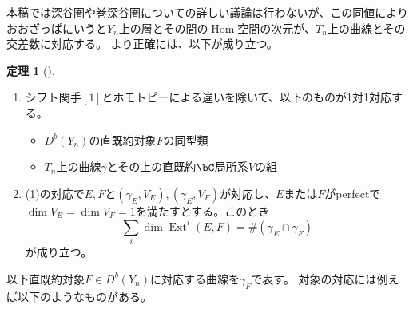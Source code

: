 \documentclass[uplatex,a4paper,dvipdfmx]{jsarticle}
\numberwithin{equation}{section}
\theoremstyle{definition}
\newtheorem{theorem}{定理}[section]
\DeclareMathOperator{\Hom}{\mathrm{Hom}}
\DeclareMathOperator{\Ext}{\mathrm{Ext}}
\begin{document}
本稿では深谷圏や巻深谷圏についての詳しい議論は行わないが、この同値によりおおざっぱにいうと$Y_n$上の層とその間の$\Hom$空間の次元が、$T_n$上の曲線とその交差数に対応する。
より正確には、以下が成り立つ。
\begin{theorem}[\cite{2020arXiv201108288O}]
	\begin{enumerate}
		\item シフト関手$[1]$とホモトピーによる違いを除いて、以下のものが1対1対応する。\begin{itemize}
			      \item $D^b(Y_n)$の直既約対象$F$の同型類
			      \item $T_n$上の曲線$\gamma$とその上の直既約$\bC$局所系$V$の組
		      \end{itemize}
		\item (1)の対応で$E,F$と$(\gamma_E, V_E), (\gamma_E, V_F)$が対応し、$E$または$F$がperfectで$\dim V_E = \dim V_F = 1$を満たすとする。このとき\begin{equation}
			      \sum_{i}\dim\Ext^i(E, F) = \#(\gamma_E \cap \gamma_F)
		      \end{equation}が成り立つ。
	\end{enumerate}
\end{theorem}
以下直既約対象$F \in D^b(Y_n)$に対応する曲線を$\gamma_F$で表す。
対象の対応には例えば以下のようなものがある。
\end{document}
